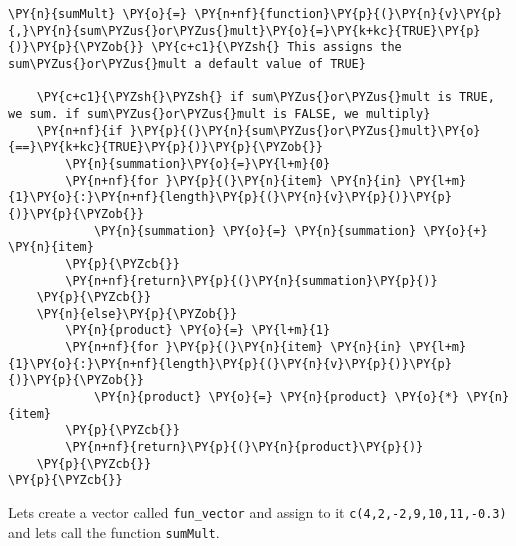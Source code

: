     \begin{tcolorbox}[breakable, size=fbox, boxrule=1pt, pad at break*=1mm,colback=cellbackground, colframe=cellborder]
\begin{Verbatim}[commandchars=\\\{\}]
\PY{n}{sumMult} \PY{o}{=} \PY{n+nf}{function}\PY{p}{(}\PY{n}{v}\PY{p}{,}\PY{n}{sum\PYZus{}or\PYZus{}mult}\PY{o}{=}\PY{k+kc}{TRUE}\PY{p}{)}\PY{p}{\PYZob{}} \PY{c+c1}{\PYZsh{} This assigns the sum\PYZus{}or\PYZus{}mult a default value of TRUE}
    
    \PY{c+c1}{\PYZsh{}\PYZsh{} if sum\PYZus{}or\PYZus{}mult is TRUE, we sum. if sum\PYZus{}or\PYZus{}mult is FALSE, we multiply}
    \PY{n+nf}{if }\PY{p}{(}\PY{n}{sum\PYZus{}or\PYZus{}mult}\PY{o}{==}\PY{k+kc}{TRUE}\PY{p}{)}\PY{p}{\PYZob{}}
        \PY{n}{summation}\PY{o}{=}\PY{l+m}{0}
        \PY{n+nf}{for }\PY{p}{(}\PY{n}{item} \PY{n}{in} \PY{l+m}{1}\PY{o}{:}\PY{n+nf}{length}\PY{p}{(}\PY{n}{v}\PY{p}{)}\PY{p}{)}\PY{p}{\PYZob{}}
            \PY{n}{summation} \PY{o}{=} \PY{n}{summation} \PY{o}{+} \PY{n}{item}
        \PY{p}{\PYZcb{}}
        \PY{n+nf}{return}\PY{p}{(}\PY{n}{summation}\PY{p}{)}
    \PY{p}{\PYZcb{}}
    \PY{n}{else}\PY{p}{\PYZob{}}
        \PY{n}{product} \PY{o}{=} \PY{l+m}{1}
        \PY{n+nf}{for }\PY{p}{(}\PY{n}{item} \PY{n}{in} \PY{l+m}{1}\PY{o}{:}\PY{n+nf}{length}\PY{p}{(}\PY{n}{v}\PY{p}{)}\PY{p}{)}\PY{p}{\PYZob{}}
            \PY{n}{product} \PY{o}{=} \PY{n}{product} \PY{o}{*} \PY{n}{item}
        \PY{p}{\PYZcb{}}
        \PY{n+nf}{return}\PY{p}{(}\PY{n}{product}\PY{p}{)}
    \PY{p}{\PYZcb{}}
\PY{p}{\PYZcb{}}
\end{Verbatim}
\end{tcolorbox}

    Lets create a vector called \texttt{fun\_vector} and assign to it
\texttt{c(4,2,-2,9,10,11,-0.3)} and lets call the function
\texttt{sumMult}.

